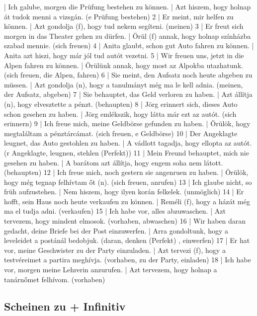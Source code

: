 \documentclass{article}
\newenvironment{exmp}{\verbatim}{\endverbatim}
\begin{document}
\begin{exmp}
1 | Ich galube, morgen die Prüfung bestehen zu können. | Azt hiszem, hogy holnap át tudok menni a vizsgán. (e Prüfung bestehen)
2 | Er meint, mir helfen zu können. | Azt gondolja (f), hogy tud nekem segíteni. (meinen)
3 | Er freut sich morgen in das Theater gehen zu dürfen. | Örül (f) annak, hogy holnap színházba szabad mennie. (sich freuen)
4 | Anita glaubt, schon gut Auto fahren zu können. | Anita azt hiszi, hogy már jól tud autót vezetni.
5 | Wir freuen uns, jetzt in die Alpen fahren zu können. | Örülünk annak, hogy most az Alpokba utazhatunk. (sich freuen, die Alpen, fahren)
6 | Sie meint, den Aufsatz noch heute abgeben zu müssen. | Azt gondolja (n), hogy a tanulmányt még ma le kell adnia. (meinen, der Aufsatz, abgeben)
7 | Sie behauptet, das Geld verloren zu haben. | Azt állítja (n), hogy elvesztette a pénzt. (behaupten)
8 | Jörg erinnert sich, dieses Auto schon gesehen zu haben. | Jörg emlékszik, hogy látta már ezt az autót. (sich erinnern)
9 | Ich freue mich, meine Geldbörse gefunden zu haben. | Örülök, hogy megtaláltam a pénztárcámat. (sich freuen, e Geldbörse)
10 | Der Angeklagte leugnet, das Auto gestohlen zu haben. | A vádlott tagadja, hogy ellopta az autót. (r Angeklagte, leugnen, stehlen (Perfekt))
11 | Mein Freund behauptet, mich nie gesehen zu haben. | A barátom azt állítja, hogy engem soha nem látott. (behaupten)
12 | Ich freue mich, noch gestern sie angenruen zu haben. | Örülök, hogy még tegnap felhívtam őt (n). (sich freuen, anrufen)
13 | Ich glaube nicht, so früh aufzustehen. | Nem hiszem, hogy ilyen korán felkelek. (unmöglich)
14 | Er hofft, sein Haus noch heute verkaufen zu können. | Reméli (f), hogy a házát még ma el tudja adni. (verkaufen)
15 | Ich habe vor, alles abzuwaschen. | Azt tervezem, hogy mindent elmosok. (vorhaben, abwaschen)
16 | Wir haben daran gedacht, deine Briefe bei der Post einzuwerfen. | Arra gondoltunk, hogy a leveleidet a postánál bedobjuk. (daran, denken (Perfekt) , einwerfen)
17 | Er hat vor, meine Geschwister zu der Party einzuladen. | Azt tervezi (f), hogy a testvéreimet a partira meghívja. (vorhaben, zu der Party, einladen)
18 | Ich habe vor, morgen meine Lehrerin anzurufen. | Azt tervezem, hogy holnap a tanárnőmet felhívom. (vorhaben)
\end{exmp}

\subsection{Scheinen zu + Infinitiv}
\end{document}
